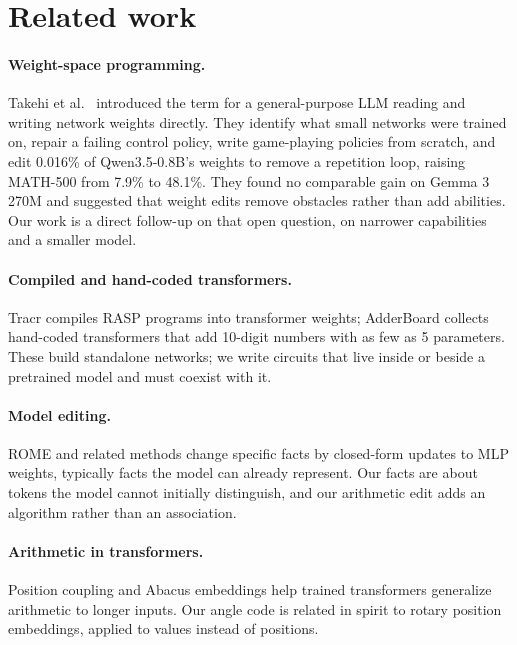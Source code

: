\documentclass[11pt]{article}
\begin{document}
\section{Related work}
\paragraph{Weight-space programming.} Takehi et al.\ \cite{takehi2026} introduced the term for a general-purpose LLM reading and writing network weights directly. They identify what small networks were trained on, repair a failing control policy, write game-playing policies from scratch, and edit 0.016\% of Qwen3.5-0.8B's weights to remove a repetition loop, raising MATH-500 from 7.9\% to 48.1\%. They found no comparable gain on Gemma 3 270M and suggested that weight edits remove obstacles rather than add abilities. Our work is a direct follow-up on that open question, on narrower capabilities and a smaller model.

\paragraph{Compiled and hand-coded transformers.} Tracr \cite{tracr} compiles RASP programs \cite{rasp} into transformer weights; AdderBoard \cite{adderboard} collects hand-coded transformers that add 10-digit numbers with as few as 5 parameters. These build standalone networks; we write circuits that live inside or beside a pretrained model and must coexist with it.

\paragraph{Model editing.} ROME \cite{rome} and related methods change specific facts by closed-form updates to MLP weights, typically facts the model can already represent. Our facts are about tokens the model cannot initially distinguish, and our arithmetic edit adds an algorithm rather than an association.

\paragraph{Arithmetic in transformers.} Position coupling \cite{cho2024} and Abacus embeddings \cite{mcleish2024} help trained transformers generalize arithmetic to longer inputs. Our angle code is related in spirit to rotary position embeddings, applied to values instead of positions.
\end{document}
